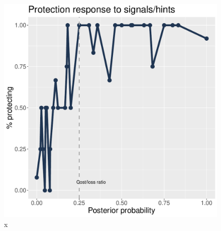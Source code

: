 \documentclass[11pt,a4paper]{article}
\begin{document}
\begin{figure}[!h]
\centering
\caption{x} \label{Informed Protection Responses}

  \centering
  \includegraphics[scale=0.3]{Graphs/IP_plot.pdf}

\end{figure}
\end{document}

